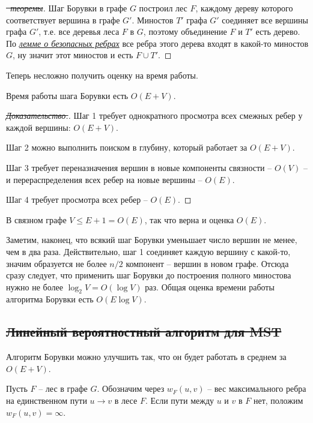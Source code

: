 \begin{proof}[\sout{\achtung ~теоремы}]
Шаг Борувки в графе $G$ построил лес $F$, каждому дереву которого соответствует вершина в графе $G'$. Миностов $T'$ графа $G'$ соединяет все вершины графа $G'$, т.е. все деревья леса $F$ в $G$, поэтому объединение $F$ и $T'$ есть дерево. По \hyperlink{baselemma}{\textit{лемме о безопасных ребрах}} все ребра этого дерева входят в какой-то миностов $G$, ну значит этот миностов и есть $F \cup T'$.
\end{proof}

Теперь несложно получить оценку на время работы.

\begin{lemma*} Время работы шага Борувки есть $O(E+V)$. \end{lemma*}
\begin{proof}[\sout{Доказательство.}]

Шаг 1 требует однократного просмотра всех смежных ребер у каждой вершины: $O(E+V)$.

Шаг 2 можно выполнить поиском в глубину, который работает за $O(E+V)$.

Шаг 3 требует переназначения вершин в новые компоненты связности -- $O(V)$ -- и перераспределения всех ребер на новые вершины  -- $O(E)$.

Шаг 4 требует просмотра всех ребер -- $O(E)$.
\end{proof}

В связном графе $V \leq E + 1 = O(E)$, так что верна и оценка $O(E)$.

Заметим, наконец, что всякий шаг Борувки уменьшает число вершин не менее, чем в два раза. Действительно, шаг 1 соединяет каждую вершину с какой-то, значим образуется не более $n/2$ компонент -- вершин в новом графе. Отсюда сразу следует, что применить шаг Борувки до построения полного миностова нужно не более $\log_2 V = O(\log V)$ раз. Общая оценка времени работы алгоритма Борувки есть $O(E\log V)$.

\subsection{\sout{Линейный вероятностный алгоритм для MST}}

Алгоритм Борувки можно улучшить так, что он будет работать в среднем за $O(E+V)$.

Пусть $F$ -- лес в графе $G$. Обозначим через $w_F(u, v)$ -- вес максимального ребра на единственном пути $u \rightarrow v$ в лесе $F$. Если пути между $u$ и $v$ в $F$ нет, положим $w_F(u,v) = \infty$.

